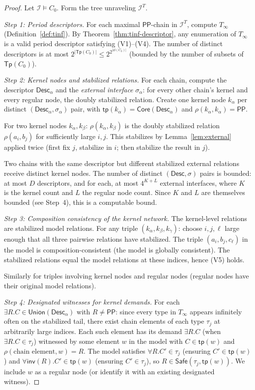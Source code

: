 \documentclass[a4paper,11pt]{article}
\theoremstyle{definition}
\newcommand{\PP}{\ensuremath{\mathsf{PP}}}
\newcommand{\inv}{\ensuremath{\mathsf{inv}}}
\newcommand{\cl}{\ensuremath{\mathsf{cl}}}
\newcommand{\tp}{\ensuremath{\mathsf{tp}}}
\newcommand{\Tp}{\ensuremath{\mathsf{Tp}}}
\newcommand{\Desc}{\ensuremath{\mathsf{Desc}}}
\newcommand{\Core}{\ensuremath{\mathsf{Core}}}
\newcommand{\Union}{\ensuremath{\mathsf{Union}}}
\newcommand{\Safe}{\ensuremath{\mathsf{Safe}}}
\newcommand{\interp}{\ensuremath{\mathcal{I}}}
\begin{document}
\begin{proof}
Let $\interp \models C_0$.  Form the tree unraveling $\interp^T$.

\medskip\noindent\textit{Step 1: Period descriptors.}\;
For each maximal $\PP$-chain in $\interp^T$, compute $T_\infty$
(Definition~\ref{def:tinf}).  By Theorem~\ref{thm:tinf-descriptor},
any enumeration of $T_\infty$ is a valid period descriptor satisfying
(V1)--(V4).  The number of distinct descriptors is at most
$2^{|\Tp(C_0)|} \le 2^{2^{|\cl(C_0)|}}$ (bounded by the number of
subsets of $\Tp(C_0)$).

\medskip\noindent\textit{Step 2: Kernel nodes and stabilized
relations.}\;
For each chain, compute the descriptor $\Desc_\alpha$ and the
\emph{external interface} $\sigma_\alpha$: for every other chain's
kernel and every regular node, the doubly stabilized relation.
Create one kernel node $k_\alpha$ per distinct $(\Desc_\alpha,
\sigma_\alpha)$ pair, with $\tp(k_\alpha) = \Core(\Desc_\alpha)$
and $\rho(k_\alpha, k_\alpha) = \PP$.

For two kernel nodes $k_\alpha, k_\beta$: $\rho(k_\alpha, k_\beta)$
is the doubly stabilized relation $\rho(a_i, b_j)$ for
sufficiently large $i, j$.  This stabilizes by
Lemma~\ref{lem:external} applied twice (first fix $j$, stabilize in
$i$; then stabilize the result in $j$).

Two chains with the same descriptor but different stabilized external
relations receive distinct kernel nodes.  The number of distinct
$(\Desc, \sigma)$ pairs is bounded: at most $D$ descriptors, and
for each, at most $4^{K + L}$ external interfaces, where $K$ is the
kernel count and $L$ the regular node count.  Since $K$ and $L$ are
themselves bounded (see Step~4), this is a computable bound.

\medskip\noindent\textit{Step 3: Composition consistency of the
kernel network.}\;
The kernel-level relations are stabilized model relations.  For any
triple $(k_\alpha, k_\beta, k_\gamma)$: choose $i, j, \ell$
large enough that all three pairwise relations have stabilized.  The
triple $(a_i, b_j, c_\ell)$ in the model is composition-consistent
(the model is globally consistent).  The stabilized relations equal
the model relations at these indices, hence (V5) holds.

Similarly for triples involving kernel nodes and regular nodes
(regular nodes have their original model relations).

\medskip\noindent\textit{Step 4: Designated witnesses for kernel
demands.}\;
For each $\exists R.C \in \Union(\Desc_\alpha)$ with $R \ne \PP$:
since every type in $T_\infty$ appears infinitely often on the
stabilized tail, there exist chain elements of each type $\tau_j$
at arbitrarily large indices.  Each such element has its demand
$\exists R.C$ (when $\exists R.C \in \tau_j$) witnessed by some
element $w$ in the model with $C \in \tp(w)$ and
$\rho(\text{chain element}, w) = R$.  The model satisfies
$\forall R.C' \in \tau_j$ (ensuring $C' \in \tp(w)$) and
$\forall\inv(R).C' \in \tp(w)$ (ensuring $C' \in \tau_j$), so
$R \in \Safe(\tau_j, \tp(w))$.  We include $w$ as a regular node
(or identify it with an existing designated witness).


\end{proof}
\end{document}
